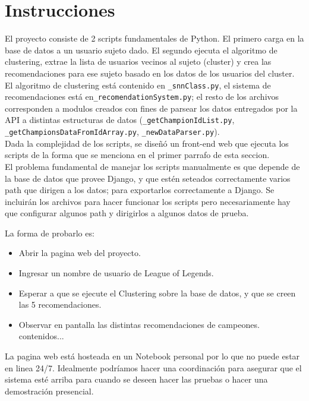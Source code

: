 \documentclass[letterpaper,11pt, spanish]{article}
\begin{document}
\section{Instrucciones}
El proyecto consiste de 2 scripts fundamentales de Python. El primero carga en la base de datos a un usuario sujeto dado. El segundo ejecuta el algoritmo de clustering, extrae la lista de usuarios vecinos al sujeto (cluster) y crea las recomendaciones para ese sujeto basado en los datos de los usuarios del cluster.\\

El algoritmo de clustering está contenido en \texttt{\_snnClass.py}, el sistema de recomendaciones está en\texttt{\_recomendationSystem.py}; el resto de los archivos corresponden a modulos creados con fines de parsear los datos entregados por la API a distintas estructuras de datos (\texttt{\_getChampionIdList.py}, \texttt{\_getChampionsDataFromIdArray.py}, \texttt{\_newDataParser.py}).\\

Dada la complejidad de los scripts, se diseñó un front-end web que ejecuta los scripts de la forma que se menciona en el primer parrafo de esta seccion.\\

El problema fundamental de manejar los scripts manualmente es que depende de la base de datos que provee Django, y que estén seteados correctamente varios path que dirigen a los datos; para exportarlos correctamente a Django. Se incluirán los archivos para hacer funcionar los scripts pero necesariamente hay que configurar algunos path y dirigirlos a algunos datos de prueba.

La forma de probarlo es:
\begin{itemize}
	\item Abrir la pagina web del proyecto.
	\item Ingresar un nombre de usuario de League of Legends.
	\item Esperar a que se ejecute el Clustering sobre la base de datos, y que se creen las 5 recomendaciones.
	\item Observar en pantalla las distintas recomendaciones de campeones.
	contenidos...
\end{itemize}

La pagina web está hosteada en un Notebook personal por lo que no puede estar en linea 24/7.
Idealmente podríamos hacer una coordinación para asegurar que el sistema esté arriba para cuando se deseen hacer las pruebas o hacer una demostración presencial.\\







\end{document}
